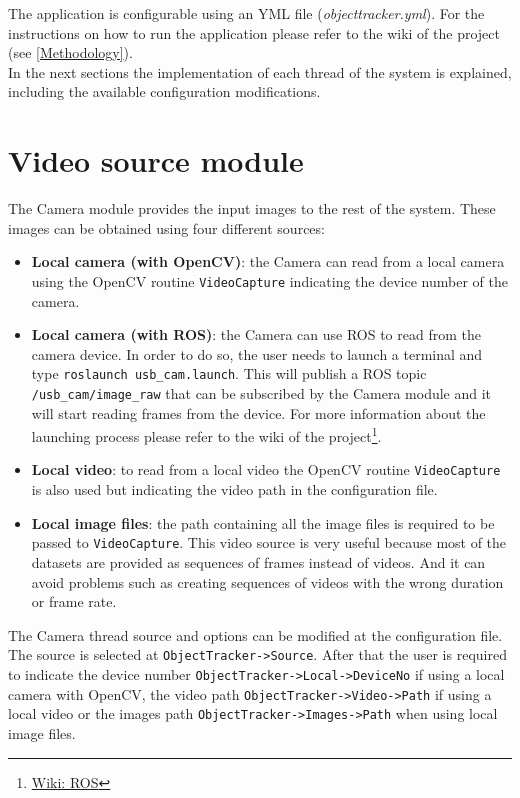 The application is configurable using an YML file (\textit{objecttracker.yml}). For the instructions on how to run the application please refer to the wiki of the project (see \ref{Methodology}).
\\In the next sections the implementation of each thread of the system is explained, including the available configuration modifications.\\

\section{Video source module}
The Camera module provides the input images to the rest of the system. These images can be obtained using four different sources:
\begin{itemize}
    \item \textbf{Local camera (with OpenCV)}: the Camera can read from a local camera using the OpenCV routine \texttt{VideoCapture} indicating the device number of the camera.
    \item \textbf{Local camera (with ROS)}: the Camera can use ROS to read from the camera device. In order to do so, the user needs to launch a terminal and type \texttt{roslaunch usb\_cam.launch}. This will publish a ROS topic \texttt{/usb\_cam/image\_raw} that can be subscribed by the Camera module and it will start reading frames from the device. For more information about the launching process please refer to the wiki of the project\footnote{\href{https://jderobot.org/Arodriguez-tfm\#Week_24:_Introducing_ROS}{Wiki: ROS}}.
    \item \textbf{Local video}: to read from a local video the OpenCV routine \texttt{VideoCapture} is also used but indicating the video path in the configuration file.
\item \textbf{Local image files}: the path containing all the image files is required to be passed to \texttt{VideoCapture}. This video source is very useful because most of the datasets are provided as sequences of frames instead of videos. And it can avoid problems such as creating sequences of videos with the wrong duration or frame rate.
\end{itemize}
The Camera thread source and options can be modified at the configuration file. The source is selected at \texttt{ObjectTracker->Source}. After that the user is required to indicate the device number \texttt{ObjectTracker->Local->DeviceNo} if using a local camera with OpenCV, the video path \texttt{ObjectTracker->Video->Path} if using a local video or the images path \texttt{ObjectTracker->Images->Path} when using local image files.\\
